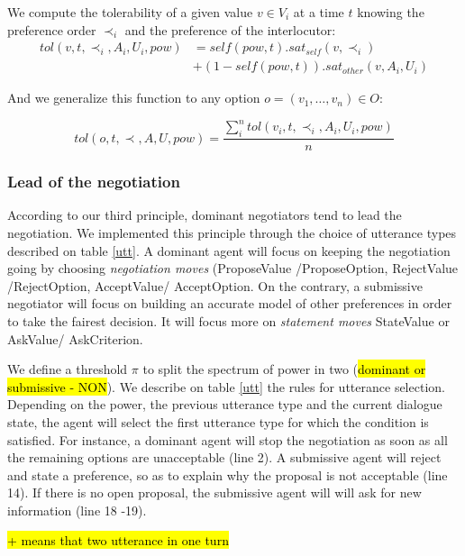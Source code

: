 \documentclass{llncs}
\begin{document}
	We compute the tolerability of a given value $v\in V_i$ at a time $t$ knowing the preference order $\prec_i$ and the preference of the interlocutor:
		\vspace{-1em} 
	\begin{equation}
	\begin{split}
	tol(v, t, \prec_i, A_i, U_i, pow) & = self(pow, t) . sat_{self}(v, \prec_i) \\
	& +  (1 - self(pow, t)) . sat_{other}(v, A_i, U_i)
	\end{split} 
	\end{equation}
	
	And we generalize this function to any option $o=(v_1,\ldots,v_n) \in O$:
	
	\begin{equation}
	tol(o, t, \prec, A, U, pow) = \frac{ \sum_{i}^{n} tol(v_i, t, \prec_i, A_i, U_i, pow) } {n}
	\end{equation}
	
	
	\subsubsection{Lead of the negotiation}
	According to our third principle, dominant negotiators tend to lead the negotiation. We implemented this principle through the choice of utterance types described on table \ref{utt}. A dominant agent will focus on keeping the negotiation going by choosing \emph{negotiation moves} (ProposeValue /ProposeOption, RejectValue /RejectOption, AcceptValue/ AcceptOption. On the contrary, a submissive negotiator will focus on building an accurate model of other preferences in order to take the fairest decision. It will focus more on \emph{statement moves} StateValue or AskValue/ AskCriterion.
	
	We define a threshold $\pi$ to split the spectrum of power in two (\hl{dominant or submissive - NON}). We describe on table \ref{utt} the rules for utterance selection. Depending on the power, the previous utterance type and the current dialogue state, the agent will select the first utterance type for which the condition is satisfied. For instance, a dominant agent will stop the negotiation as soon as all the remaining options are unacceptable (line 2). A submissive agent will reject and state a preference, so as to explain why the proposal is not acceptable (line 14). If there is no open proposal, the submissive agent will will ask for new information (line 18 -19).
	
	\hl{+ means that two utterance in one turn}
\end{document}
